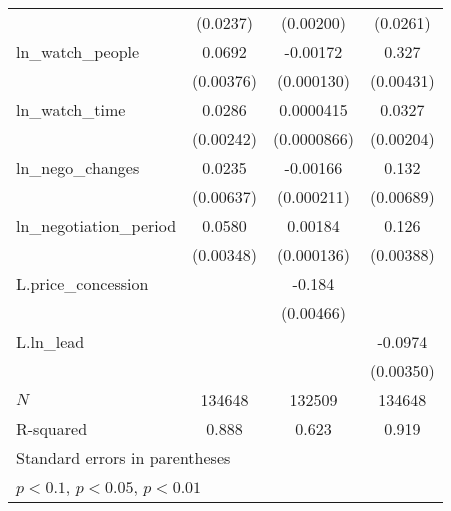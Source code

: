 {\begin{tabular}{l*{3}{c}}
            &    (0.0237)         &   (0.00200)         &    (0.0261)         \\
\addlinespace
ln\_watch\_people&      0.0692\sym{***}&    -0.00172\sym{***}&       0.327\sym{***}\\
            &   (0.00376)         &  (0.000130)         &   (0.00431)         \\
\addlinespace
ln\_watch\_time&      0.0286\sym{***}&   0.0000415         &      0.0327\sym{***}\\
            &   (0.00242)         & (0.0000866)         &   (0.00204)         \\
\addlinespace
ln\_nego\_changes&      0.0235\sym{***}&    -0.00166\sym{***}&       0.132\sym{***}\\
            &   (0.00637)         &  (0.000211)         &   (0.00689)         \\
\addlinespace
ln\_negotiation\_period&      0.0580\sym{***}&     0.00184\sym{***}&       0.126\sym{***}\\
            &   (0.00348)         &  (0.000136)         &   (0.00388)         \\
\addlinespace
L.price\_concession&                     &      -0.184\sym{***}&                     \\
            &                     &   (0.00466)         &                     \\
\addlinespace
L.ln\_lead   &                     &                     &     -0.0974\sym{***}\\
            &                     &                     &   (0.00350)         \\
\midrule
\(N\)       &      134648         &      132509         &      134648         \\
R-squared   &       0.888         &       0.623         &       0.919         \\
\bottomrule
\multicolumn{4}{l}{\footnotesize Standard errors in parentheses}\\
\multicolumn{4}{l}{\footnotesize \sym{*} \(p<0.1\), \sym{**} \(p<0.05\), \sym{***} \(p<0.01\)}\\
\end{tabular}
}
